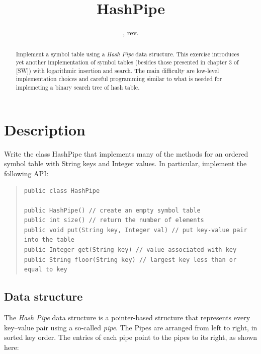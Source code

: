 \documentclass{tufte-handout}
\title{HashPipe}
\author{}
\date{\GITAuthorDate, rev. \GITAbrHash}
\begin{document}
\maketitle

\begin{abstract}
  Implement a symbol table using a \emph{Hash Pipe} data structure.
  This exercise introduces yet another implementation of symbol tables (besides those presented in chapter 3 of [SW]) with logarithmic insertion and search.
  The main difficulty are low-level implementation choices and careful programming  similar to what is needed for implemeting a binary search tree of hash table.
\end{abstract}

\section{Description}

Write the class HashPipe that implements many of the methods for an ordered symbol table with String keys and Integer values. 
In particular, implement the following API:

\begin{quotation}
\begin{fullwidth}\small
\begin{verbatim}
public class HashPipe 

public HashPipe() // create an empty symbol table
public int size() // return the number of elements
public void put(String key, Integer val) // put key-value pair into the table
public Integer get(String key) // value associated with key
public String floor(String key) // largest key less than or equal to key 
 \end{verbatim}
\end{fullwidth}
\end{quotation}

\subsection{Data structure}

The \emph{Hash Pipe} data structure is a pointer-based structure that represents every key--value pair using a so-called \emph{pipe}.
The Pipes are arranged from left to right, in sorted key order.
The entries of each pipe point to the pipes to its right, as shown here:
\end{document}
